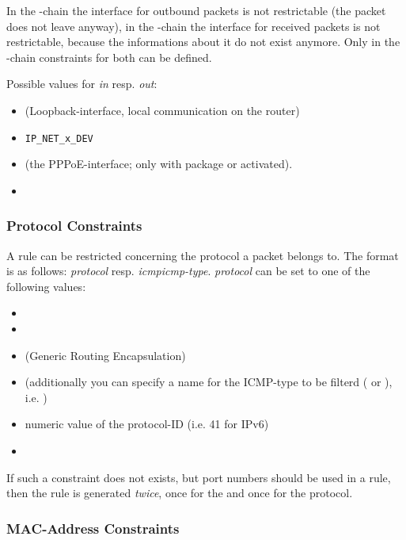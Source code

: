 In the -chain the interface for outbound packets is not
restrictable (the packet does not leave anyway), in the -chain
the interface for received packets is not restrictable, because the
informations about it do not exist anymore. Only in the -chain
constraints for both can be defined.

Possible values for \emph{in} resp. \emph{out}:

\begin{itemize}
  \item {} (Loopback-interface, local communication on the router)
  \item \verb+IP_NET_x_DEV+
  \item {} (the PPPoE-interface; only with package 
		or  activated).
  \item {}
\end{itemize}

\subsubsection{Protocol Constraints}

A rule can be restricted concerning the protocol a packet belongs to.
The format is as follows:
\emph{protocol} resp. \emph{icmp}\fwmatch{:}\emph{icmp-type}.
\emph{protocol} can be set to one of the following values:

\begin{itemize}
  \item {}
  \item {}
  \item {} (Generic Routing Encapsulation)
  \item {} (additionally you can specify a name for the ICMP-type to be filterd ( or
    ), i.e. )
  \item numeric value of the protocol-ID (i.e. 41 for IPv6)
  \item {}
\end{itemize}

If such a constraint does not exists, but port numbers should
be used in a rule, then the rule is generated \emph{twice},
once for the  and once for the  protocol.

\subsubsection{MAC-Address Constraints}

